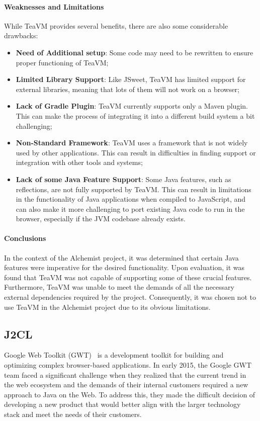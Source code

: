 \paragraph{Weaknesses and Limitations} While TeaVM provides several benefits, there are also some considerable drawbacks:
\begin{itemize}
	\item \textbf{Need of Additional setup}: Some code may need to be rewritten to ensure proper functioning of TeaVM;
	\item \textbf{Limited Library Support}: Like JSweet, TeaVM has limited support for external libraries, meaning that lots of them will not work on a browser;
	\item\textbf{Lack of Gradle Plugin}: TeaVM currently supports only a Maven plugin. This can make the process of integrating it into a different build system a bit challenging;
	\item \textbf{Non-Standard Framework}: TeaVM uses a framework that is not widely used by other applications. This can result in difficulties in finding support or integration with other tools and systems;
	\item \textbf{Lack of some Java Feature Support}: Some Java features, such as reflections, are not fully supported by TeaVM. This can result in limitations in the functionality of Java applications when compiled to JavaScript, and can also make it more challenging to port existing Java code to run in the browser, especially if the JVM codebase already exists.
\end{itemize}
\paragraph{Conclusions} In the context of the Alchemist project, it was determined that certain Java features were imperative for the desired functionality. Upon evaluation, it was found that TeaVM was not capable of supporting some of these crucial features. Furthermore, TeaVM was unable to meet the demands of all the necessary external dependencies required by the project. Consequently, it was chosen not to use TeaVM in the Alchemist project due to its obvious limitations.
\subsection{J2CL}
\label{ssec:j2cl}
Google Web Toolkit (GWT)~\cite{GWT93:online} is a development toolkit for building and optimizing complex browser-based applications. In early 2015, the Google GWT team faced a significant challenge when they realized that the current trend in the web ecosystem and the demands of their internal customers required a new approach to Java on the Web. To address this, they made the difficult decision of developing a new product that would better align with the larger technology stack and meet the needs of their customers.\newline

